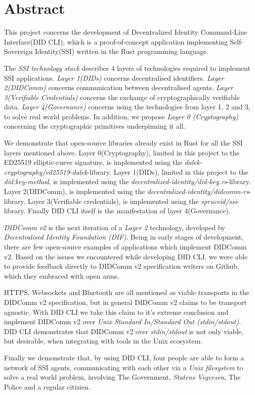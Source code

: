 \chapter*{Abstract}

This project concerns the development of Decentralized Identity Command-Line Interface(DID CLI), which is a proof-of-concept application implementing Self-Sovereign Identity(SSI) written in the Rust programming language.

The \textit{SSI technology stack} describes 4 layers of technologies required to implement SSI applications. \textit{Layer 1(DIDs)} concerns decentralised identifiers. \textit{Layer 2(DIDComm)} concerns communication between decentralised agents. \textit{Layer 3(Verifiable Credentials)} concerns the exchange of cryptographically verifiable data. \textit{Layer 4(Governance)} concerns using the technologies from layer 1, 2 and 3, to solve real world problems. In addition, we propose \textit{Layer 0 (Cryptography)} concerning the cryptographic primitives underpinning it all.


We demonstrate that open-source libraries already exist in Rust for all the SSI layers mentioned above. Layer 0(Cryptography), limited in this project to the ED25519 elliptic-curve signature, is implemented using the \textit{dalek-cryptography/ed25519-dalek}-library. Layer 1(DIDs), limited in this project to the \textit{did:key-method}, is implemented using the \textit{decentralized-identity/did-key.rs}-library. Layer 2(DIDComm), is implemented using the \textit{decentralized-identity/didcomm-rs}-library. Layer 3(Verifiable credentials), is implemented using the \textit{spruceid/ssi}-library. Finally DID CLI itself is the manifestation of layer 4(Governance).


\textit{DIDComm v2} is the next iteration of a \textit{Layer 2} technology, developed by \textit{Decentralised Identity Foundation (DIF)}. Being in early stages of development, there are few open-source examples of applications which implement DIDComm v2. Based on the issues we encountered while developing DID CLI, we were able to provide feedback directly to DIDComm v2 specification writers on Github, which they embraced with open arms.


HTTPS, Websockets and Bluetooth are all mentioned as viable transports in the DIDComm v2 specification, but in general DIDComm v2 claims to be transport agnostic. With DID CLI we take this claim to it's extreme conclusion and implement DIDComm v2 over \textit{Unix Standard In/Standard Out (stdin/stdout)}. DID CLI demonstrates that DIDComm v2 over \textit{stdin/stdout} is not only viable, but desirable, when integrating with tools in the Unix ecosystem. 

Finally we demonstrate that, by using DID CLI, four people are able to form a network of SSI agents, communicating with each other via a \textit{Unix filesystem} to solve a real world problem, involving The Government, \textit{Statens Vegvesen}, The Police and a regular citizien.